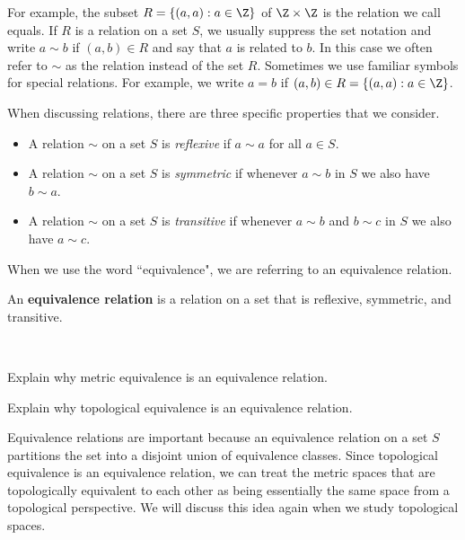 For example, the subset $R = \{(a,a) : a \in \Z \}$ of $\Z \times \Z$ is the relation we call equals. If $R$ is a relation on a set $S$, we usually suppress the set notation and write $a \sim b$ if $(a,b) \in R$ and say that $a$ is related to $b$. In this case we often refer to $\sim$ as the relation instead of the set $R$. Sometimes we use familiar symbols for special relations. For example, we write $a = b$ if $(a,b) \in R = \{(a,a) : a \in \Z \}$.

When discussing relations, there are three specific properties that we consider.

\begin{itemize}
\item A relation $\sim$ on a set $S$ is \emph{reflexive} if $a \sim a$ for all $a \in S$.
\item A relation $\sim$ on a set $S$ is \emph{symmetric} if whenever $a \sim b$ in $S$ we also have $b \sim a$.
\item A relation $\sim$ on a set $S$ is \emph{transitive} if whenever $a \sim b$ and $b \sim c$ in $S$ we also have $a \sim c$.
\end{itemize}

When we use the word ``equivalence", we are referring to an equivalence relation.



\begin{definition} An \textbf{equivalence relation} is a relation on a set that is reflexive, symmetric, and transitive.  
\end{definition}



\begin{activity} ~
\ba
\item Explain why metric equivalence is an equivalence relation.



\item Explain why topological equivalence is an equivalence relation.



\ea

\end{activity}



Equivalence relations are important because an equivalence relation on a set $S$ partitions the set into a disjoint union of equivalence classes. Since topological equivalence is an equivalence relation, we can treat the metric spaces that are topologically equivalent to each other as being essentially the same space from a topological perspective. We will discuss  this idea again when we study topological spaces. 


